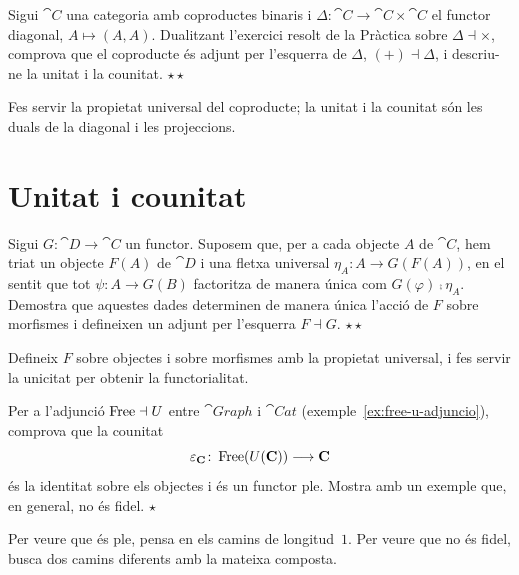 \begin{exercici}
Sigui $\cat{C}$ una categoria amb coproductes binaris i $\Delta\colon\cat{C}\to\cat{C}\times\cat{C}$ el functor diagonal, $A\mapsto(A,A)$. Dualitzant l'exercici resolt de la Pràctica sobre $\Delta\dashv\times$, comprova que el coproducte és adjunt per l'esquerra de $\Delta$, $(+)\dashv\Delta$, i descriu-ne la unitat i la counitat. \hfill{\normalfont$\star\star$}
\begin{indicacio}
Fes servir la propietat universal del coproducte; la unitat i la counitat són les duals de la diagonal i les projeccions.
\end{indicacio}
\end{exercici}

\section{Unitat i counitat}

\begin{exercici}\label{exr:adj-fletxes-universals}
Sigui $G\colon\cat{D}\to\cat{C}$ un functor. Suposem que, per a cada objecte $A$ de $\cat{C}$, hem triat un objecte $F(A)$ de $\cat{D}$ i una fletxa universal $\eta_A\colon A\to G(F(A))$, en el sentit que tot $\psi\colon A\to G(B)$ factoritza de manera única com $G(\varphi)\comp\eta_A$. Demostra que aquestes dades determinen de manera única l'acció de $F$ sobre morfismes i defineixen un adjunt per l'esquerra $F\dashv G$. \hfill{\normalfont$\star\star$}
\begin{indicacio}
Defineix $F$ sobre objectes i sobre morfismes amb la propietat universal, i fes servir la unicitat per obtenir la functorialitat.
\end{indicacio}
\end{exercici}

\begin{exercici}
Per a l'adjunció $\operatorname{Free}\dashv U$ entre $\cat{Graph}$ i $\cat{Cat}$ (exemple~\ref{ex:free-u-adjuncio}), comprova que la counitat
\[
\varepsilon_{\mathbf{C}}\colon\operatorname{Free}(U(\mathbf{C}))\longrightarrow\mathbf{C}
\]
és la identitat sobre els objectes i és un functor ple. Mostra amb un exemple que, en general, no és fidel. \hfill{\normalfont$\star$}
\begin{indicacio}
Per veure que és ple, pensa en els camins de longitud~$1$. Per veure que no és fidel, busca dos camins diferents amb la mateixa composta.
\end{indicacio}
\end{exercici}

